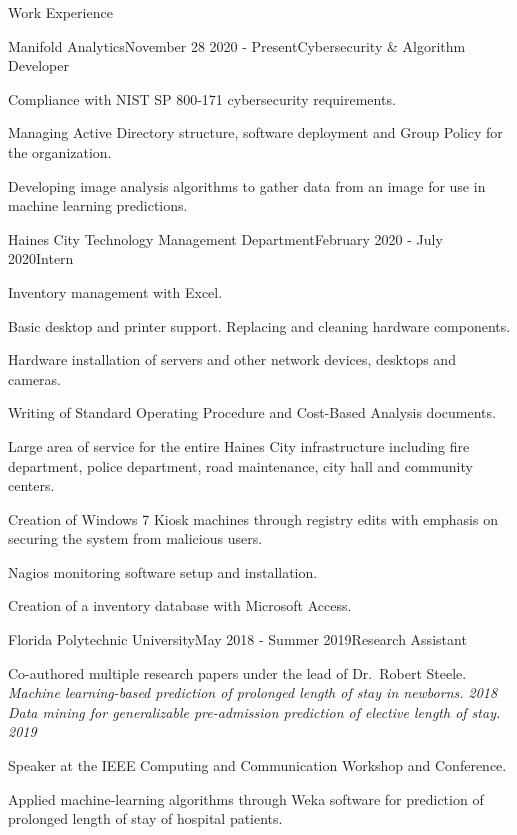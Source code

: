 \documentclass{resume} %
\begin{document}

\begin{rSection}{Work Experience}

\begin{rSubsection}{Manifold Analytics}{November 28 2020 - Present}{Cybersecurity \& Algorithm Developer}{}
	\item Compliance with NIST SP 800-171 cybersecurity requirements.
	\item Managing Active Directory structure, software deployment and Group Policy for the organization.
	\item Developing image analysis algorithms to gather data from an image for use in machine learning predictions.
\end{rSubsection}

\begin{rSubsection}{Haines City Technology Management Department}{February 2020 - July 2020}{Intern}{}
	\item Inventory management with Excel. 
	\item Basic desktop and printer support. Replacing and cleaning hardware components.
	\item Hardware installation of servers and other network devices, desktops and cameras.
	\item Writing of Standard Operating Procedure and Cost-Based Analysis documents.
	\item Large area of service for the entire Haines City infrastructure including fire department, police department, road maintenance, city hall and community centers.
	\item Creation of Windows 7 Kiosk machines through registry edits with emphasis on securing the system from malicious users.
	\item Nagios monitoring software setup and installation.
	\item Creation of a inventory database with Microsoft Access.
\end{rSubsection}
\newpage
\begin{rSubsection}{Florida Polytechnic University}{May 2018 - Summer 2019}{Research Assistant}{}
	\item Co-authored multiple research papers under the lead of Dr.\ Robert Steele.\\
	{\it Machine learning-based prediction of prolonged length of stay in newborns. 2018}\\
	{\it Data mining for generalizable pre-admission prediction of elective length of stay. 2019}
	\item Speaker at the IEEE Computing and Communication Workshop and Conference.
	\item Applied machine-learning algorithms through Weka software for prediction of prolonged length of stay of hospital patients.
\end{rSubsection}

\end{rSection}
\end{document}
